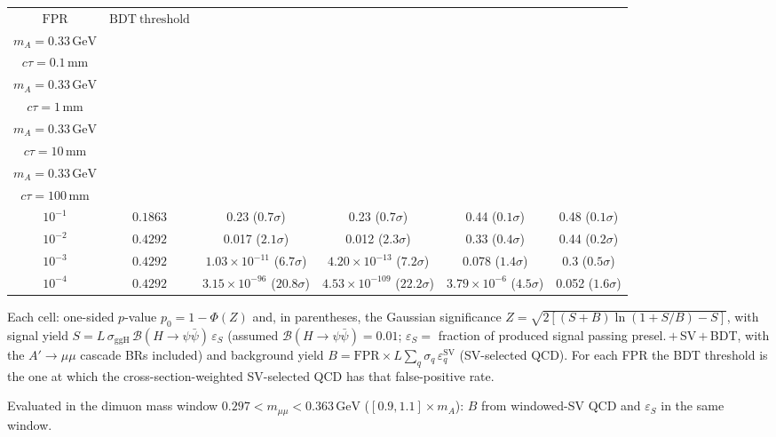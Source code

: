 \documentclass[10pt,a4paper]{article}
\begin{document}
{\begin{tabular}{cccccc}
\toprule
$\mathrm{FPR}$ & $\mathrm{BDT\ threshold}$ & \shortstack{$m_{\pi}=1\,\mathrm{GeV}$\\$m_{A}=0.33\,\mathrm{GeV}$\\$c\tau=0.1\,\mathrm{mm}$} & \shortstack{$m_{\pi}=1\,\mathrm{GeV}$\\$m_{A}=0.33\,\mathrm{GeV}$\\$c\tau=1\,\mathrm{mm}$} & \shortstack{$m_{\pi}=1\,\mathrm{GeV}$\\$m_{A}=0.33\,\mathrm{GeV}$\\$c\tau=10\,\mathrm{mm}$} & \shortstack{$m_{\pi}=1\,\mathrm{GeV}$\\$m_{A}=0.33\,\mathrm{GeV}$\\$c\tau=100\,\mathrm{mm}$} \\
\midrule
$10^{-1}$ & $0.1863$ & 0.23 ($0.7\sigma$) & 0.23 ($0.7\sigma$) & 0.44 ($0.1\sigma$) & 0.48 ($0.1\sigma$)\\
$10^{-2}$ & $0.4292$ & 0.017 ($2.1\sigma$) & 0.012 ($2.3\sigma$) & 0.33 ($0.4\sigma$) & 0.44 ($0.2\sigma$)\\
$10^{-3}$ & $0.4292$ & $1.03\times10^{-11}$ ($6.7\sigma$) & $4.20\times10^{-13}$ ($7.2\sigma$) & 0.078 ($1.4\sigma$) & 0.3 ($0.5\sigma$)\\
$10^{-4}$ & $0.4292$ & $3.15\times10^{-96}$ ($20.8\sigma$) & $4.53\times10^{-109}$ ($22.2\sigma$) & $3.79\times10^{-6}$ ($4.5\sigma$) & 0.052 ($1.6\sigma$)\\
\bottomrule
\end{tabular}

{\small Each cell: one-sided $p$-value $p_0=1-\Phi(Z)$ and, in parentheses, the Gaussian significance $Z=\sqrt{2\left[(S{+}B)\ln(1{+}S/B)-S\right]}$, with signal yield $S=L\,\sigma_{\mathrm{ggH}}\,\mathcal{B}(H\to\psi\bar{\psi})\,\varepsilon_S$ (assumed $\mathcal{B}(H\to\psi\bar{\psi})=0.01$; $\varepsilon_S=$ fraction of produced signal passing presel.\,$+$\,SV\,$+$\,BDT, with the $A'\to\mu\mu$ cascade BRs included) and background yield $B=\mathrm{FPR}\times L\sum_q\sigma_q\,\varepsilon_q^{\mathrm{SV}}$ (SV-selected QCD). For each FPR the BDT threshold is the one at which the cross-section-weighted SV-selected QCD has that false-positive rate.}

{\small Evaluated in the dimuon mass window $0.297<m_{\mu\mu}<0.363\,\mathrm{GeV}$ ($[0.9,1.1]\times m_A$): $B$ from windowed-SV QCD and $\varepsilon_S$ in the same window.}

}\clearpage
\end{document}
